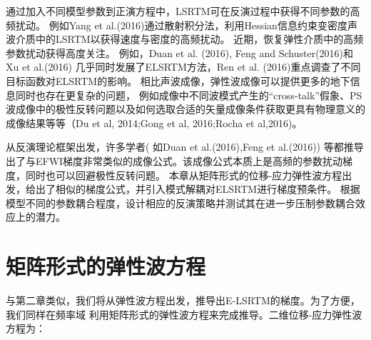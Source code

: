 通过加入不同模型参数到正演方程中，LSRTM可在反演过程中获得不同参数的高频扰动。
例如Yang et
al.(2016)\cite{Yang2016}通过散射积分法，利用Hessian信息约束变密度声波介质中的LSRTM以获得速度与密度的高频扰动。
近期，恢复弹性介质中的高频参数扰动获得高度关注。
例如，Duan et al. (2016)\cite{Duan2016}, Feng and Schuster(2016)\cite{Feng2016}和Xu et al.(2016)
\cite{Xu2016}几乎同时发展了ELSRTM方法，Ren et al. (2016)\cite{RenEtAl2016}重点调查了不同目标函数对ELSRTM的影响。
相比声波成像，弹性波成像可以提供更多的地下信息同时也存在更复杂的问题，
例如成像中不同波模式产生的“cross-talk”假象、PS波成像中的极性反转问题以及如何选取合适的矢量成像条件获取更具有物理意义的成像结果等等（Du et al,
2014\cite{DuEtAl2014};Gong et
al, 2016\cite{GongEtAl2016};Rocha et al,2016\cite{RochaEtAl2016a})。

从反演理论框架出发，许多学者(
如Duan et al.(2016)\cite{Duan2016},Feng et
al.(2016)\cite{Feng2016})
等都推导出了与EFWI梯度非常类似的成像公式。该成像公式本质上是高频的参数扰动梯度，同时也可以回避极性反转问题。
本章从矩阵形式的位移-应力弹性波方程出发，给出了相似的梯度公式，并引入模式解耦对ELSRTM进行梯度预条件。
根据模型不同的参数耦合程度，设计相应的反演策略并测试其在进一步压制参数耦合效应上的潜力。
\clearpage
\section{矩阵形式的弹性波方程}
与第二章类似，我们将从弹性波方程出发，推导出E-LSRTM的梯度。为了方便，我们同样在频率域
利用矩阵形式的弹性波方程来完成推导。二维位移-应力弹性波方程为：


